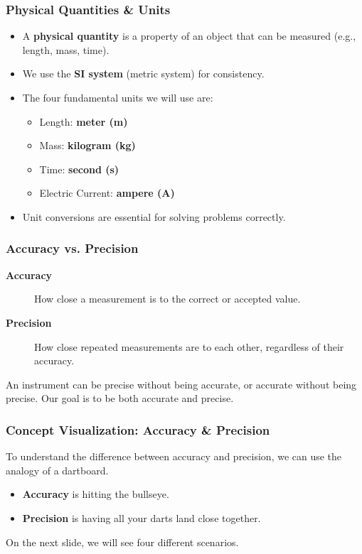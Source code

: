 \documentclass{beamer}
\begin{document}
\begin{frame}
\frametitle{Physical Quantities \& Units}
\begin{itemize}
    \item A \textbf{physical quantity} is a property of an object that can be measured (e.g., length, mass, time).
    \item We use the \textbf{SI system} (metric system) for consistency.
    \item The four fundamental units we will use are:
    \begin{itemize}
        \item Length: \textbf{meter (m)}
        \item Mass: \textbf{kilogram (kg)}
        \item Time: \textbf{second (s)}
        \item Electric Current: \textbf{ampere (A)}
    \end{itemize}
    \item Unit conversions are essential for solving problems correctly.
\end{itemize}
\end{frame}

\begin{frame}
\frametitle{Accuracy vs. Precision}
\begin{description}
    \item[\textbf{Accuracy}] How close a measurement is to the correct or accepted value.
    \item[\textbf{Precision}] How close repeated measurements are to each other, regardless of their accuracy.
\end{description}
\vspace{1em}
An instrument can be precise without being accurate, or accurate without being precise. Our goal is to be both accurate and precise.
\end{frame}

\begin{frame}
\frametitle{Concept Visualization: Accuracy \& Precision}
To understand the difference between accuracy and precision, we can use the analogy of a dartboard.
\begin{itemize}
    \item \textbf{Accuracy} is hitting the bullseye.
    \item \textbf{Precision} is having all your darts land close together.
\end{itemize}
On the next slide, we will see four different scenarios.
\end{frame}
\end{document}
